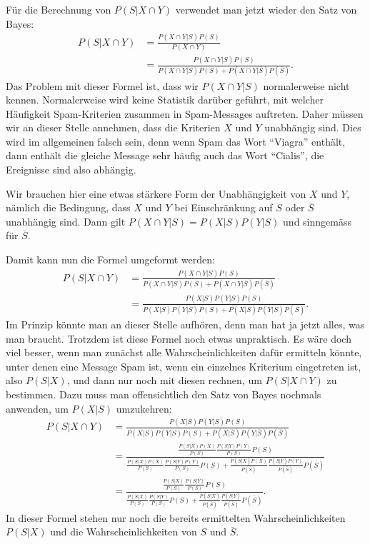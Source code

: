 Für die Berechnung von $P(S|X\cap Y)$ verwendet man jetzt wieder
den Satz von Bayes:
\begin{align}
P(S|X\cap Y)
&=
\frac{P(X\cap Y|S)P(S)}{P(X\cap Y)}\nonumber
\\
&=
\frac{P(X\cap Y|S)P(S)}{P(X\cap Y|S)P(S)+P(X\cap Y|\bar S)P(\bar S)}.
\end{align}
Das Problem mit dieser Formel ist, dass wir $P(X\cap Y|S)$ normalerweise
nicht kennen.
Normalerweise wird keine Statistik darüber geführt, mit
welcher Häufigkeit Spam-Kriterien zusammen in Spam-Messages auftreten.
Daher müssen wir an dieser Stelle annehmen, dass die Kriterien $X$ und $Y$
unabhängig sind.
Dies wird im allgemeinen falsch sein, denn wenn Spam
das Wort ``Viagra'' enthält, dann enthält die gleiche Message sehr häufig
auch das Wort ``Cialis'', die Ereignisse sind also abhängig.

Wir brauchen hier eine etwas stärkere Form der Unabhängigkeit von $X$ und $Y$,
nämlich die Bedingung, dass $X$ und $Y$ bei Einschränkung auf $S$
oder $\bar S$ unabhängig sind.
Dann gilt $P(X\cap Y|S)=P(X|S)P(Y|S)$
und sinngemäss für $\bar S$.

Damit kann nun die Formel umgeformt werden:
\begin{align}
P(S|X\cap Y)
&=
\frac{P(X\cap Y|S)P(S)}{P(X\cap Y|S)P(S)+P(X\cap Y|\bar S)P(\bar S)}\nonumber
\\
&=
\frac{P(X|S)P(Y|S)P(S)}{P(X|S)P(Y|S)P(S)+P(X|\bar S)P(Y|\bar S)P(\bar S)}.
\end{align}
Im Prinzip könnte man an dieser Stelle aufhören, denn man hat ja jetzt
alles, was man braucht.
Trotzdem ist diese Formel noch etwas unpraktisch.
Es wäre doch viel besser, wenn man zunächst alle Wahrscheinlichkeiten
dafür ermitteln könnte, unter denen eine Message Spam ist, wenn ein
einzelnes Kriterium eingetreten ist, also $P(S|X)$, und dann nur noch
mit diesen rechnen, um $P(S|X\cap Y)$ zu bestimmen.
Dazu muss man offensichtlich den Satz von Bayes nochmals anwenden, um
$P(X|S)$ umzukehren:
\begin{align}
P(S|X\cap Y)
&=
\frac{P(X|S)P(Y|S)P(S)}{P(X|S)P(Y|S)P(S)+P(X|\bar S)P(Y|\bar S)P(\bar S)}\nonumber
\\
&=
\frac{\displaystyle
\frac{P(S|X)P(X)}{P(S)}
\frac{P(S|Y)P(Y)}{P(S)}P(S)
}{\displaystyle
\frac{P(S|X)P(X)}{P(S)}
\frac{P(S|Y)P(Y)}{P(S)}P(S)
+
\frac{P(\bar S|X)P(X)}{P(\bar S)}
\frac{P(\bar S|Y)P(Y)}{P(\bar S)}P(\bar S)
}\nonumber
\\
&=
\frac{\displaystyle
\frac{P(S|X)}{P(S)}
\frac{P(S|Y)}{P(S)}P(S)
}{\displaystyle
\frac{P(S|X)}{P(S)}
\frac{P(S|Y)}{P(S)}P(S)
+
\frac{P(\bar S|X)}{P(\bar S)}
\frac{P(\bar S|Y)}{P(\bar S)}P(\bar S)
}.
\end{align}
In dieser Formel stehen nur noch die bereits ermittelten Wahrscheinlichkeiten
$P(S|X)$ und die Wahrscheinlichkeiten von $S$ und $\bar S$.

